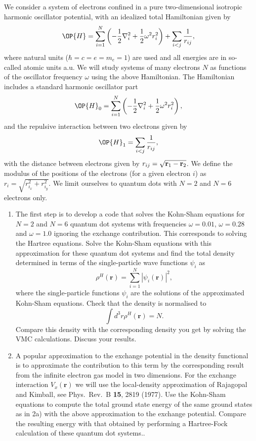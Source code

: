 \begin{prob}
We consider a system of electrons confined in a pure two-dimensional 
isotropic harmonic oscillator potential, with an idealized  total Hamiltonian given by 
\[
\OP{H}=\sum_{i=1}^{N} \left(  -\frac{1}{2} \nabla_i^2 + \frac{1}{2} \omega^2r_i^2  \right)+\sum_{i<j}\frac{1}{r_{ij}},
\]
where natural units ($\hbar=c=e=m_e=1$) are used and all energies are in so-called atomic units a.u. We will study systems of many electrons $N$ as functions of the oscillator frequency  $\omega$ using the above Hamiltonian.  The Hamiltonian includes a standard harmonic oscillator part
\[
\OP{H}_0=\sum_{i=1}^{N} \left(  -\frac{1}{2} \nabla_i^2 + \frac{1}{2} \omega^2r_i^2  \right),
\]
and the repulsive interaction between two electrons given by 
\[
\OP{H}_1=\sum_{i<j}\frac{1}{r_{ij}},
\]
with the distance between electrons given by $r_{ij}=\sqrt{{\bf r}_1-{\bf r}_2}$. We define the 
modulus of the positions of the electrons (for a given electron $i$) as $r_i = \sqrt{r_{i_x}^2+r_{i_y}^2}$.
We limit ourselves to quantum dots with $N=2$ and $N=6$ electrons only.

\begin{enumerate}
\item The first step is to develop a code that solves the Kohn-Sham equations for $N=2$ and $N=6$ quantum dot systems with frequencies $\omega=0.01$,
$\omega=0.28$ and $\omega=1.0$ ignoring the exchange contribution. 
This corresponds to solving the Hartree equations. 
Solve the  Kohn-Sham equations with this approximation for these quantum dot systems
and find the total density determined in terms of the single-particle wave functions
$\psi_i$ as
\[
\rho^H(\mathbf{r})=\sum_{i=1}^N|\psi_i(\mathbf{r})|^2,
\]
where the single-particle functions $\psi_i$ are the solutions of the approximated Kohn-Sham equations.
Check that the density is normalised to
\[
\int d^3 r \rho^H(\mathbf{r}) = N.
\]
Compare this density with the corresponding density 
you get by solving the VMC calculations. Discuss your results.

\item   A popular approximation to the exchange potential in the density functional is to
approximate the contribution to this term by the corresponding result from the infinite electron gas
model in two dimensions.  For the exchange interaction
$V_x(\mathbf{r})$ we will use the local-density approximation of Rajagopal and Kimball, see Phys.~Rev.~B {\bf 15}, 2819 (1977).
Use the Kohn-Sham  equations to compute the total ground state energy of the same ground states as in 2a)  
with the above approximation
to the exchange potential.
Compare the resulting energy with that obtained by performing a Hartree-Fock calculation of these quantum dot systems..

\end{enumerate}
\end{prob}

